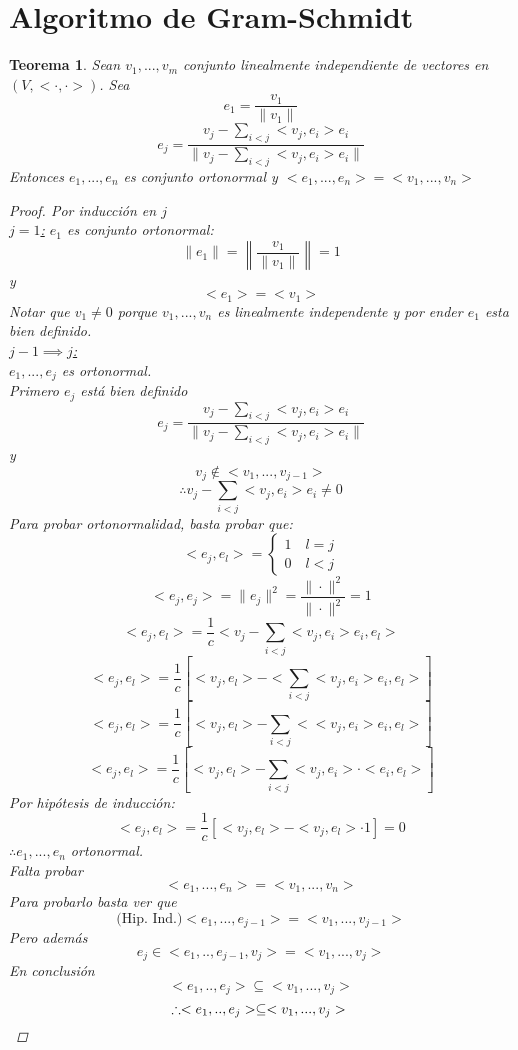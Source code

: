 \documentclass[11pt]{book}
\newtheorem{thm}{Teorema}[section]
\theoremstyle{definition}
\begin{document}
\section{Algoritmo de Gram-Schmidt}
\begin{thm}
	Sean $v_1,...,v_m$ conjunto linealmente independiente de vectores en $(V,<\cdot,\cdot>)$. Sea
	\[e_1=\frac{v_1}{\|v_1\|}\]
	\[e_j=\frac{v_j-\sum_{i<j}<v_j,e_i>e_i}{\|v_j-\sum_{i<j}<v_j,e_i>e_i\|}\]
	Entonces $e_1,...,e_n$ es conjunto ortonormal y $<e_1,...,e_n>=<v_1,...,v_n>$
	\begin{proof}
		Por inducción en $j$\\
		\underline{$j=1$:} $e_1$ es conjunto ortonormal:
		\[\|e_1\|=\left\|\frac{v_1}{\|v_1\|}\right\|=1\]
		y
		\[<e_1>=<v_1>\]
		Notar que $v_1\neq 0$ porque $v_1,...,v_n$ es linealmente independente y por ender $e_1$ esta bien definido.\\
		\underline{$j-1\implies j$:}\\
		$e_1,...,e_j$ es ortonormal.\\
		Primero $e_j$ está bien definido
		\[e_j=\frac{v_j-\sum_{i<j}<v_j,e_i>e_i}{\|v_j-\sum_{i<j}<v_j,e_i>e_i\|}\]
		y
		\[v_j\notin <v_1,...,v_{j-1}>\]
		\[\therefore v_j-\sum_{i<j}<v_j,e_i>e_i\neq 0\]
		Para probar ortonormalidad, basta probar que:
		\[<e_j,e_l>=\begin{cases}
				1\quad l=j \\
				0\quad l<j
			\end{cases}\]
		\[<e_j,e_j>=\|e_j\|^2=\frac{\|\cdot\|^2}{\|\cdot\|^2}=1\]
		\[<e_j,e_l>=\frac{1}{c}<v_j-\sum_{i<j}<v_j,e_i>e_i,e_l>\]
		\[<e_j,e_l>=\frac{1}{c}\left[<v_j,e_l>-<\sum_{i<j}<v_j,e_i>e_i,e_l>\right]\]
		\[<e_j,e_l>=\frac{1}{c}\left[<v_j,e_l>-\sum_{i<j}<<v_j,e_i>e_i,e_l>\right]\]
		\[<e_j,e_l>=\frac{1}{c}\left[<v_j,e_l>-\sum_{i<j}<v_j,e_i>\cdot<e_i,e_l>\right]\]
		Por hipótesis de inducción:
		\[<e_j,e_l>=\frac{1}{c}\left[<v_j,e_l>-<v_j,e_l>\cdot 1\right]=0\]
		$\therefore e_1,...,e_n$ ortonormal.\\
		Falta probar
		\[<e_1,...,e_n>=<v_1,...,v_n>\]
		Para probarlo basta ver que
		\[\textrm{(Hip. Ind.)} <e_1,...,e_{j-1}>=<v_1,...,v_{j-1}>\]
		Pero además
		\[e_j\in<e_1,..,e_{j-1},v_j>=<v_1,...,v_j>\]
		En conclusión
		\[<e_1,..,e_j>\subseteq<v_1,...,v_j>\]
		\[\therefore<e_1,..,e_j>\subseteq<v_1,...,v_j>\qedhere\]
	\end{proof}
\end{thm}
\end{document}
